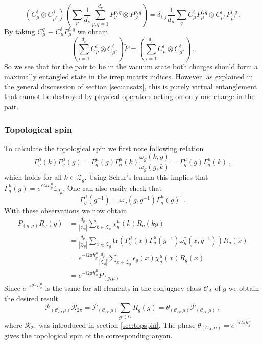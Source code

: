 \documentclass[12 pt]{article}
\begin{document}
\begin{equation}
    \left(C_\mu^i\otimes C_{\mu^*}^j\right)\left( \sum_{\nu}\frac{1}{d_\nu}\sum_{p,q=1}^{d_\nu}P^{p,q}_\nu\otimes P^{p,q}_{\nu^*}\right) = \delta_{i,j}\frac{1}{d_\mu}\sum_q C_\mu^i P_\mu^{i,q}\otimes C_{\mu^*}^i P_{\mu^*}^{i,q}\, .
\end{equation}
By taking $C_\mu^q \equiv C_\mu^i P_\mu^{i,q}$ we obtain
\begin{equation}
    \left(\sum_{i = 1}^{d_\mu}C_\mu^i\otimes C_{\mu^*}^i\right)\tilde{P} = \left(\sum_{i = 1}^{d_\mu}C_\mu^i\otimes C_{\mu^*}^i\right)\, .
\end{equation}
So we see that for the pair to be in the vacuum state both charges should form a maximally entangled state in the irrep matrix indices. However, as explained in the general discusssion of section \ref{sec:ansatz}, this is purely virtual entanglement that cannot be destroyed by physical operators acting on only one charge in the pair.


\subsubsection{Topological spin}

To calculate the topological spin we first note following relation
\begin{equation}
    \Gamma^\mu_g(k)\Gamma^\mu_g(g) = \Gamma^\mu_g(g)\Gamma^\mu_g(k)\frac{\omega_g(k,g)}{\omega_g(g,k)} =  \Gamma^\mu_g(g)\Gamma^\mu_g(k)\, ,
\end{equation}
which holds for all $k \in \mathcal{Z}_g$. Using Schur's lemma this implies that $\Gamma_g^\mu(g) = e^{i2\pi h^\mu_g}\mathds{1}_{d_\mu}$. One can also easily check that
\begin{equation}
    \Gamma_g^\mu(g^{-1}) = \omega_g(g,g^{-1})\Gamma_g^\mu(g)^\dagger\, .
\end{equation}
With these observations we now obtain
\begin{align}
    P_{(g,\mu)}R_g(g) &=  \frac{d_\mu}{|\mathcal{Z}_g|}\sum_{k\in\mathcal{Z}_g} \chi^\mu_g(k)R_g(kg)\nonumber\\
                      &= \frac{d_\mu}{|\mathcal{Z}_g|}\sum_{x\in\mathcal{Z}_g} \text{tr}(\Gamma^\mu_g(x)\Gamma^\mu_g(g^{-1})\omega^*_g(x,g^{-1}))R_g(x)\nonumber\\
                      &= e^{-i2\pi h^\mu_g}\frac{d_\mu}{|\mathcal{Z}_g|}\sum_{x\in\mathcal{Z}_g} \epsilon_g(x) \chi^\mu_g(x)R_g(x) \nonumber\\
                      &=  e^{-i2\pi h^\mu_g} P_{(g,\mu)} \nonumber
\end{align}
Since $e^{-i2\pi h^\mu_g}$ is the same for all elements in the conjugacy class $\mathcal{C}_A$ of $g$ we obtain the desired result
\begin{equation}
    \mathcal{P}_{(\mathcal{C}_A,\mu)}\mathcal{R}_{2\pi} = \mathcal{P}_{(\mathcal{C}_A,\mu)}\sum_{g \in  \mathsf{G}}R_g(g) = \theta_{(\mathcal{C}_A,\mu)}\mathcal{P}_{(\mathcal{C}_A,\mu)}\, ,
\end{equation}
where $\mathcal{R}_{2\pi}$ was introduced in section \ref{sec:topspin}. The phase $\theta_{(\mathcal{C}_A,\mu)} = e^{-i2\pi h^\mu_g}$ gives the topological spin of the corresponding anyon.
\end{document}
